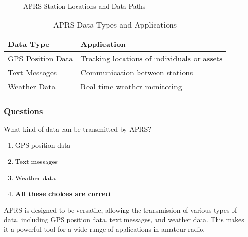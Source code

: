 \begin{figure}[h]
    \centering
    \caption{APRS Station Locations and Data Paths}
    \label{fig:aprs-map}
\end{figure}

\begin{table}[h]
    \centering
    \begin{tabular}{|l|l|}
        \hline
        \textbf{Data Type} & \textbf{Application} \\
        \hline
        GPS Position Data & Tracking locations of individuals or assets \\
        Text Messages & Communication between stations \\
        Weather Data & Real-time weather monitoring \\
        \hline
    \end{tabular}
    \caption{APRS Data Types and Applications}
    \label{tab:aprs-data-types}
\end{table}

\subsubsection*{Questions}

\begin{tcolorbox}[colback=gray!10!white,colframe=black!75!black,title={T8D03}]
    What kind of data can be transmitted by APRS?
    \begin{enumerate}[label=\Alph*),noitemsep]
        \item GPS position data
        \item Text messages
        \item Weather data
        \item \textbf{All these choices are correct}
    \end{enumerate}
\end{tcolorbox}

APRS is designed to be versatile, allowing the transmission of various types of data, including GPS position data, text messages, and weather data. This makes it a powerful tool for a wide range of applications in amateur radio.

